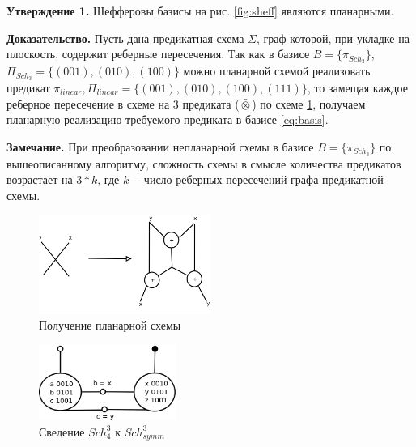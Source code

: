 \documentclass[12pt]{article}
\begin{document}
\label{planar_basis}
\textbf{Утверждение 1.} Шефферовы базисы на рис. \ref{fig:sheff} являются планарными.

\textbf{Доказательство.} Пусть дана предикатная схема $\Sigma$, граф которой, при укладке на плоскость, содержит
реберные пересечения. Так как в базисе $B=\{\pi_{Sch_3}\}$, $\Pi_{Sch_3} = \{ (001), (010), (100) \}$
\label{eq:basis} можно планарной схемой реализовать предикат 
$\pi_{linear}, \Pi_{linear} = \{ (001), (010), (100), (111) \}$, то замещая каждое реберное пересечение в схеме на 
3 предиката ($\bar{\otimes}$) по схеме \ref{fig:xor}, получаем планарную реализацию требуемого предиката
в базисе \ref{eq:basis}.

\textbf{Замечание.} При преобразовании непланарной схемы в базисе $B=\{\pi_{Sch_3}\}$
по вышеописанному алгоритму, сложность схемы в смысле количества предикатов возрастает на $3*k$, где $k$~-- число реберных
пересечений графа предикатной схемы.


\begin{figure}[htb]
\centering
\includegraphics[width=0.5\textwidth]{intersection.png}
\caption{Получение планарной схемы}
\label{fig:xor}
\end{figure}


\begin{figure}[htb]
\centering
\includegraphics[width=0.4\textwidth]{scheff4.png}
\caption{Сведение $Sch_4^3$ к $Sch_{symm}^3$}
\label{fig:scheff3_4}
\end{figure}
\end{document}
